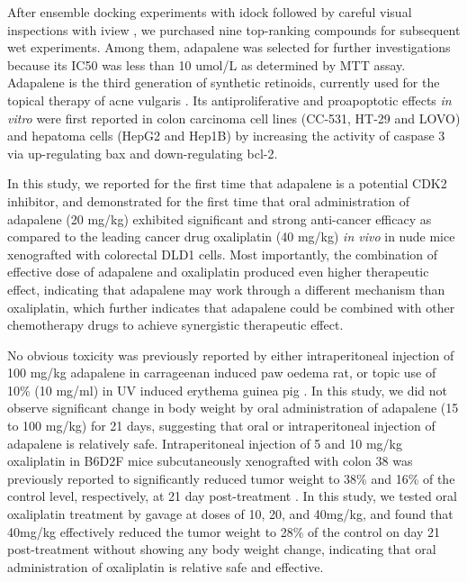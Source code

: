 After ensemble docking experiments with idock \citep{1153,1362} followed by careful visual inspections with iview \citep{1366}, we purchased nine top-ranking compounds for subsequent wet experiments. Among them, adapalene was selected for further investigations because its IC50 was less than 10 umol/L as determined by MTT assay. Adapalene is the third generation of synthetic retinoids, currently used for the topical therapy of acne vulgaris \citep{1599}. Its antiproliferative and proapoptotic effects \textit{in vitro} were first reported in colon carcinoma cell lines (CC-531, HT-29 and LOVO) \citep{1600} and hepatoma cells (HepG2 and Hep1B) \citep{1601} by increasing the activity of caspase 3 via up-regulating bax and down-regulating bcl-2.

In this study, we reported for the first time that adapalene is a potential CDK2 inhibitor, and demonstrated for the first time that oral administration of adapalene (20 mg/kg) exhibited significant and strong anti-cancer efficacy as compared to the leading cancer drug oxaliplatin (40 mg/kg) \textit{in vivo} in nude mice xenografted with colorectal DLD1 cells. Most importantly, the combination of effective dose of adapalene and oxaliplatin produced even higher therapeutic effect, indicating that adapalene may work through a different mechanism than oxaliplatin, which further indicates that adapalene could be combined with other chemotherapy drugs to achieve synergistic therapeutic effect.

No obvious toxicity was previously reported by either intraperitoneal injection of 100 mg/kg adapalene in carrageenan induced paw oedema rat, or topic use of 10\% (10 mg/ml) in UV induced erythema guinea pig \citep{1604}. In this study, we did not observe significant change in body weight by oral administration of adapalene (15 to 100 mg/kg) for 21 days, suggesting that oral or intraperitoneal injection of adapalene is relatively safe. Intraperitoneal injection of 5 and 10 mg/kg oxaliplatin in B6D2F mice subcutaneously xenografted with colon 38 was previously reported to significantly reduced tumor weight to 38\% and 16\% of the control level, respectively, at 21 day post-treatment \citep{1605}. In this study, we tested oral oxaliplatin treatment by gavage at doses of 10, 20, and 40mg/kg, and found that 40mg/kg effectively reduced the tumor weight to 28\% of the control on day 21 post-treatment without showing any body weight change, indicating that oral administration of oxaliplatin is relative safe and effective.


